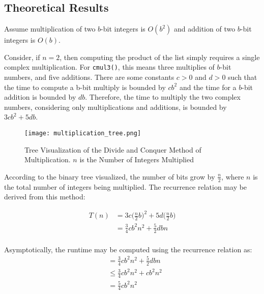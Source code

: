 \documentclass[usletter, 12pt]{article}
\begin{document}
        \subsection{Theoretical Results}
        Assume multiplication of two $b$-bit integers is $O(b^{2})$ and addition of two $b$-bit integers is $O(b)$.

        Consider, if $n = 2$, then computing the product of the list simply requires a single complex multiplication. For \texttt{cmul3()}, this means three multiplies of $b$-bit numbers, and five additions. There are some constants $c>0$ and $d>0$ such that the time to compute a b-bit multiply is bounded by $cb^2$ and the time for a $b$-bit addition is bounded by $db$.  Therefore, the time to multiply the two complex numbers, considering only multiplications and additions, is bounded by $3cb^2+5db$.

        \begin{figure}[ht]
            \begin{center}
                \texttt{[image: multiplication\_tree.png]}
                \caption{Tree Visualization of the Divide and Conquer Method of Multiplication. $n$ is the Number of Integers Multiplied} \label{multiplication_tree}
            \end{center}
        \end{figure}

        According to the binary tree visualized, the number of bits grow by $\frac{n}{2}$, where $n$ is the total number of integers being multiplied. The recurrence relation may be derived from this method:

        \begin{equation*}
            \begin{split}
                T(n) & = 3c \Bigg( \frac{n}{2}b \Bigg)^2 + 5d \Bigg(\frac{n}{2}b \Bigg) \\
                & = \frac{3}{4}cb^2n^2+\frac{5}{2}dbn \\
            \end{split}
        \end{equation*}

        Asymptotically, the runtime may be computed using the recurrence relation as:
        \begin{equation*}
            \begin{split}
                & = \frac{3}{4}cb^2n^2+\frac{5}{2}dbn \\
                & \leq \frac{3}{4}cb^2n^2 + cb^2n^2 \\
                & = \frac{5}{4}cb^2n^2
            \end{split}
        \end{equation*}
\end{document}
